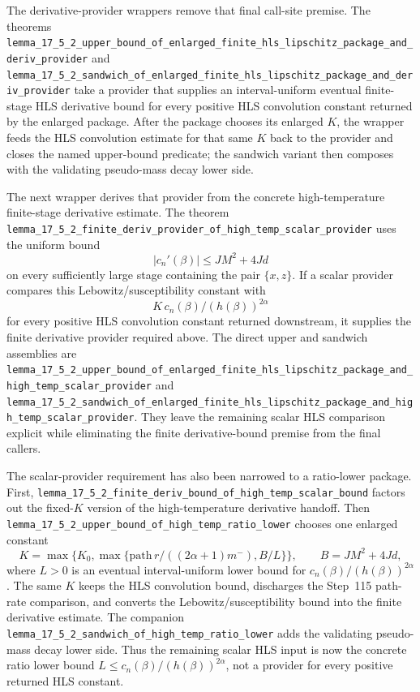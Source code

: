\documentclass[a4paper,11pt]{article}
\begin{document}
The derivative-provider wrappers remove that final call-site premise.  The
theorems
\texttt{lemma\_17\_5\_2\_upper\_bound\_of\_enlarged\_finite\_hls\_lipschitz\_package\_and\_deriv\_provider}
and
\texttt{lemma\_17\_5\_2\_sandwich\_of\_enlarged\_finite\_hls\_lipschitz\_package\_and\_deriv\_provider}
take a provider that supplies an interval-uniform eventual finite-stage HLS
derivative bound for every positive HLS convolution constant returned by the
enlarged package.  After the package chooses its enlarged \(K\), the wrapper
feeds the HLS convolution estimate for that same \(K\) back to the provider and
closes the named upper-bound predicate; the sandwich variant then composes with
the validating pseudo-mass decay lower side.

The next wrapper derives that provider from the concrete high-temperature
finite-stage derivative estimate.  The theorem
\texttt{lemma\_17\_5\_2\_finite\_deriv\_provider\_of\_high\_temp\_scalar\_provider}
uses the uniform bound
\[
  |c_n'(\beta)| \le J M^2 + 4Jd
\]
on every sufficiently large stage containing the pair \(\{x,z\}\).  If a
scalar provider compares this Lebowitz/susceptibility constant with
\[
  K\,c_n(\beta)/(h(\beta))^{2\alpha}
\]
for every positive HLS convolution constant returned downstream, it supplies
the finite derivative provider required above.  The direct upper and sandwich
assemblies are
\texttt{lemma\_17\_5\_2\_upper\_bound\_of\_enlarged\_finite\_hls\_lipschitz\_package\_and\_high\_temp\_scalar\_provider}
and
\texttt{lemma\_17\_5\_2\_sandwich\_of\_enlarged\_finite\_hls\_lipschitz\_package\_and\_high\_temp\_scalar\_provider}.
They leave the remaining scalar HLS comparison explicit while eliminating the
finite derivative-bound premise from the final callers.

The scalar-provider requirement has also been narrowed to a ratio-lower
package.  First,
\texttt{lemma\_17\_5\_2\_finite\_deriv\_bound\_of\_high\_temp\_scalar\_bound}
factors out the fixed-\(K\) version of the high-temperature derivative handoff.
Then
\texttt{lemma\_17\_5\_2\_upper\_bound\_of\_high\_temp\_ratio\_lower}
chooses one enlarged constant
\[
  K=\max\{K_0,\max\{ \mathrm{path}\,r/((2\alpha+1)m^-), B/L\}\},
  \qquad B=J M^2+4Jd,
\]
where \(L>0\) is an eventual interval-uniform lower bound for
\(c_n(\beta)/(h(\beta))^{2\alpha}\).  The same \(K\) keeps the HLS convolution
bound, discharges the Step~115 path-rate comparison, and converts the
Lebowitz/susceptibility bound into the finite derivative estimate.  The
companion
\texttt{lemma\_17\_5\_2\_sandwich\_of\_high\_temp\_ratio\_lower} adds the
validating pseudo-mass decay lower side.  Thus the remaining scalar HLS input
is now the concrete ratio lower bound \(L\le c_n(\beta)/(h(\beta))^{2\alpha}\),
not a provider for every positive returned HLS constant.
\end{document}
